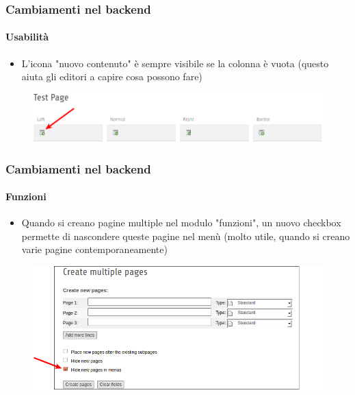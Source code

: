 
\begin{frame}[fragile]
	\frametitle{Cambiamenti nel backend}
	\framesubtitle{Usabilità}

 	\begin{itemize}
		\item L'icona "nuovo contenuto" è sempre visibile se la colonna è vuota\newline
			\small(questo aiuta gli editori a capire cosa possono fare)\normalsize
	\end{itemize}

	\begin{figure}
		\includegraphics[width=0.95\linewidth]{Images/BackendChanges/NewContentIconAlwaysVisible.png}
	\end{figure}

\end{frame}


\begin{frame}[fragile]
	\frametitle{Cambiamenti nel backend}
	\framesubtitle{Funzioni}

 	\begin{itemize}
		\item Quando si creano pagine multiple nel modulo "funzioni", un nuovo checkbox permette di nascondere queste pagine nel menù\newline
			\small(molto utile, quando si creano varie pagine contemporaneamente)\normalsize
	\end{itemize}

	\begin{figure}
		\includegraphics[width=0.85\linewidth]{Images/BackendChanges/CreateMultiplePagesHideInMenu.png}
	\end{figure}

\end{frame}

